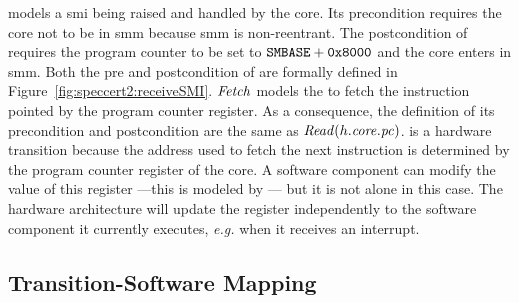  models a \ac{smi} being raised and handled by the core.
%
Its precondition requires the core not to be in \ac{smm} because \ac{smm} is
non-reentrant.
%
The postcondition of  requires the program counter to be set to
$\texttt{SMBASE} + \mathtt{0x8000}$ and the core enters in \ac{smm}.
%
Both the pre and postcondition of  are formally defined in
Figure~\ref{fig:speccert2:receiveSMI}.
%
$\mathit{Fetch}$ models the \IO to fetch the instruction pointed by the program
counter register.
%
As a consequence, the definition of its precondition and postcondition are the
same as \( \mathit{Read}(h.\mathit{core}.\mathit{pc}) \).
%
 is a hardware transition because the address used to fetch the next
instruction is determined by the program counter register of the core.
%
A software component can modify the value of this register ---this is modeled by
--- but it is not alone in this case.
%
The hardware architecture will update the register independently to the software
component it currently executes, \emph{e.g.} when it receives an interrupt.

\subsection{Transition-Software Mapping}
\label{subsec:minx86:fetched}

